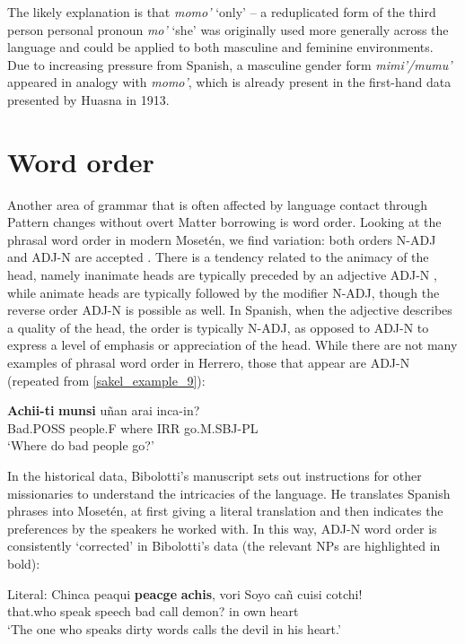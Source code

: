 \documentclass[output=paper,colorlinks,citecolor=brown
]{langscibook}
\begin{document}
The likely explanation is that \textit{momo’} ‘only’ – a reduplicated form of the third person personal pronoun \textit{mo’} ‘she’ was originally used more generally across the language and could be applied to both masculine and feminine environments. Due to increasing pressure from Spanish, a masculine gender form \textit{mimi’/mumu’} appeared in analogy with \textit{momo’}, which is already present in the first-hand data presented by Huasna in 1913.

\section{Word order}
Another area of grammar that is often affected by language contact through Pattern changes without overt Matter borrowing is word order. Looking at the phrasal word order in modern Mosetén, we find variation: both orders N-ADJ and ADJ-N are accepted \cite[p.~103]{sakel2004grammar}. There is a tendency related to the animacy of the head, namely inanimate heads are typically preceded by an adjective ADJ-N , while animate heads are typically followed by the modifier N-ADJ, though the reverse order ADJ-N is possible as well. In Spanish, when the adjective describes a quality of the head, the order is typically N-ADJ, as opposed to ADJ-N to express a level of emphasis or appreciation of the head.
While there are not many examples of phrasal word order in Herrero, those that appear are ADJ-N (repeated from \ref{sakel_example_9}):

\ea \label{sakel_example_14}
\gll \textbf{Achii-ti} 	\textbf{munsi} 		uñan 	arai  	inca-in?\\
     Bad.POSS	people.F	where	IRR 	go.M.SBJ-PL\\
\glt ‘Where do bad people go?’
\z	

In the historical data, Bibolotti’s manuscript sets out instructions for other missionaries to understand the intricacies of the language. He translates Spanish phrases into Mosetén, at first giving a literal translation and then indicates the preferences by the speakers he worked with. In this way, ADJ-N word order is consistently ‘corrected’ in Bibolotti’s data (the relevant NPs are highlighted in bold): 

Literal:
\ea \label{sakel_example_15}
\gll Chinca  peaqui  \textbf{peacge}  \textbf{achis},  vori    Soyo    cañ cuisi   cotchi!\\
     that.who   speak    speech  bad	call   demon?    in  own heart\\
\glt ‘The one who speaks dirty words calls the devil in his heart.’
\z	
\end{document}
